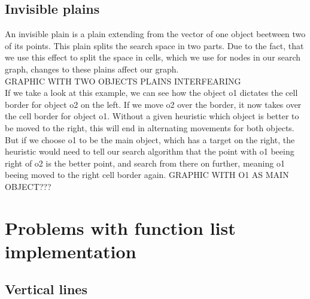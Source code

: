 \subsection{Invisible plains}
An invisible plain is a plain extending from the vector of one object beetween two of its points. This plain splits the search space in two parts. Due to the fact, that we use this effect to split the space in cells, which we use for nodes in our search graph, changes to these plains affect our graph.\\
GRAPHIC WITH TWO OBJECTS PLAINS INTERFEARING\\
If we take a look at this example, we can see how the object o1 dictates the cell border for object o2 on the left. If we move o2 over the border, it now takes over the cell border for object o1. Without a given heuristic which object is better to be moved to the right, this will end in alternating movements for both objects.\\
But if we choose o1 to be the main object, which has a target on the right, the heuristic would need to tell our search algorithm that the point with o1 beeing right of o2 is the better point, and search from there on further, meaning o1 beeing moved to the right cell border again.
GRAPHIC WITH O1 AS MAIN OBJECT???

\section{Problems with function list implementation}
\subsection{Vertical lines}




